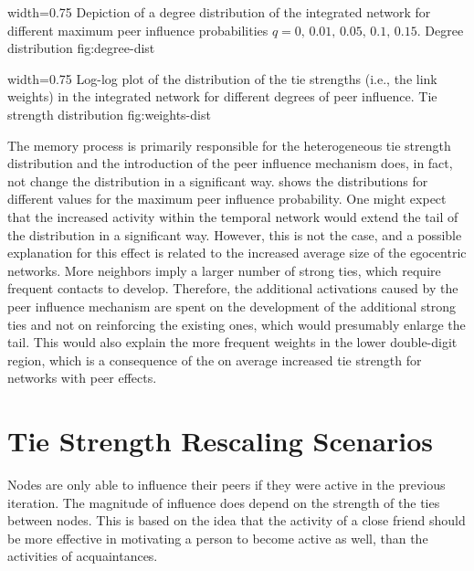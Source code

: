       {width=0.75\textwidth}
      {Depiction of a degree distribution of the integrated network for different maximum peer influence probabilities \( q = 0, \, 0.01, \, 0.05, \, 0.1, \, 0.15\).}
      {Degree distribution}
      {fig:degree-dist}


      {width=0.75\textwidth}
      {Log-log plot of the distribution of the tie strengths (i.e., the link weights) in the integrated network for different degrees of peer influence.}
      {Tie strength distribution}
      {fig:weights-dist}

The memory process is primarily responsible for the heterogeneous tie strength distribution and the introduction of the peer influence mechanism does, in fact, not change the distribution in a significant way.
 shows the distributions for different values for the maximum peer influence probability.
One might expect that the increased activity within the temporal network would extend the tail of the distribution in a significant way.
However, this is not the case, and a possible explanation for this effect is related to the increased average size of the egocentric networks.
More neighbors imply a larger number of strong ties, which require frequent contacts to develop.
Therefore, the additional activations caused by the peer influence mechanism are spent on the development of the additional strong ties and not on reinforcing the existing ones, which would presumably enlarge the tail.
This would also explain the more frequent weights in the lower double-digit region, which is a consequence of the on average increased tie strength for networks with peer effects.




\section{Tie Strength Rescaling Scenarios}
\label{sec:softmax-rescaling}

Nodes are only able to influence their peers if they were active in the previous iteration.
The magnitude of influence does depend on the strength of the ties between nodes.
This is based on the idea that the activity of a close friend should be more effective in motivating a person to become active as well, than the activities of acquaintances.

